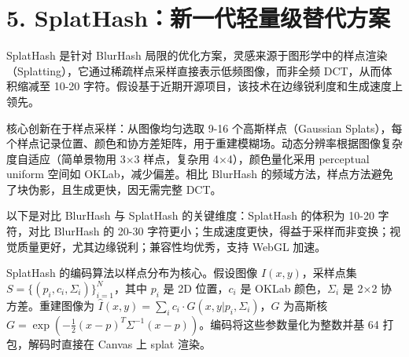 \chapter{5. SplatHash：新一代轻量级替代方案}
SplatHash 是针对 BlurHash 局限的优化方案，灵感来源于图形学中的样点渲染（Splatting），它通过稀疏样点采样直接表示低频图像，而非全频 DCT，从而体积缩减至 10-20 字符。假设基于近期开源项目，该技术在边缘锐利度和生成速度上领先。\par
核心创新在于样点采样：从图像均匀选取 9-16 个高斯样点（Gaussian Splats），每个样点记录位置、颜色和协方差矩阵，用于重建模糊场。动态分辨率根据图像复杂度自适应（简单景物用 3×3 样点，复杂用 4×4），颜色量化采用 perceptual uniform 空间如 OKLab，减少偏差。相比 BlurHash 的频域方法，样点方法避免了块伪影，且生成更快，因无需完整 DCT。\par
以下是对比 BlurHash 与 SplatHash 的关键维度：SplatHash 的体积为 10-20 字符，对比 BlurHash 的 20-30 字符更小；生成速度更快，得益于采样而非变换；视觉质量更好，尤其边缘锐利；兼容性均优秀，支持 WebGL 加速。\par
SplatHash 的编码算法以样点分布为核心。假设图像 $I(x,y)$，采样点集 $S = \{(p_i, c_i, \Sigma_i)\}_{i=1}^N$，其中 $p_i$ 是 2D 位置，$c_i$ 是 OKLab 颜色，$\Sigma_i$ 是 2×2 协方差。重建图像为 $\hat{I}(x,y) = \sum_i c_i \cdot G(x,y | p_i, \Sigma_i)$，$G$ 为高斯核 $G = \exp\left( -\frac{1}{2} (x-p)^T \Sigma^{-1} (x-p) \right)$。编码将这些参数量化为整数并基 64 打包，解码时直接在 Canvas 上 splat 渲染。\par
